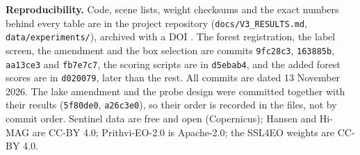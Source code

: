 \documentclass[11pt]{article}
\begin{document}
\textbf{Reproducibility.} Code, scene lists, weight checksums and the exact numbers behind every table are in the project repository (\texttt{docs/V3\_RESULTS.md}, \texttt{data/experiments/}), archived with a DOI \cite{habitatshift2026}. The forest registration, the label screen, the amendment and the box selection are commits \texttt{9fc28c3}, \texttt{163885b}, \texttt{aa13ce3} and \texttt{fb7e7c7}, the scoring scripts are in \texttt{d5ebab4}, and the added forest scores are in \texttt{d020079}, later than the rest. All commits are dated 13 November 2026. The lake amendment and the probe design were committed together with their results (\texttt{5f80de0}, \texttt{a26c3e0}), so their order is recorded in the files, not by commit order. Sentinel data are free and open (Copernicus); Hansen and Hi-MAG are CC-BY 4.0; Prithvi-EO-2.0 is Apache-2.0; the SSL4EO weights are CC-BY 4.0.



\end{document}
